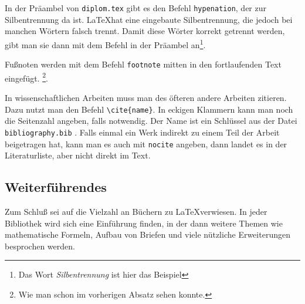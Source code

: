 In der Präambel von \verb|diplom.tex| gibt es den Befehl \verb|hypenation|, der zur Silbentrennung da ist. \LaTeX hat eine eingebaute Silbentrennung, die jedoch bei manchen Wörtern falsch trennt. Damit diese Wörter korrekt getrennt werden, gibt man sie dann mit dem Befehl in der Präambel an\footnote{Das Wort \emph{Silbentrennung} ist hier das Beispiel}.

Fußnoten werden mit dem Befehl \verb|footnote| mitten in den fortlaufenden Text eingefügt. \footnote{Wie man schon im vorherigen Absatz sehen konnte.}.

In wissenschaftlichen Arbeiten muss man des öfteren andere Arbeiten zitieren. Dazu nutzt man den Befehl \verb|\cite{name}|. In eckigen Klammern kann man noch die Seitenzahl angeben, falls notwendig. Der Name ist ein Schlüssel aus der Datei \verb|bibliography.bib| \cite[S.~10]{kopka}. Falls einmal ein Werk indirekt zu einem Teil der Arbeit beigetragen hat, kann man es auch mit \verb|nocite| angeben, dann landet es in der Literaturliste, aber nicht direkt im Text.


\subsection{Weiterführendes}

Zum Schluß sei auf die Vielzahl an Büchern zu \LaTeX verwiesen. In jeder Bibliothek wird sich eine Einführung finden, in der dann weitere Themen wie mathematische Formeln, Aufbau von Briefen und viele nützliche Erweiterungen besprochen werden.

